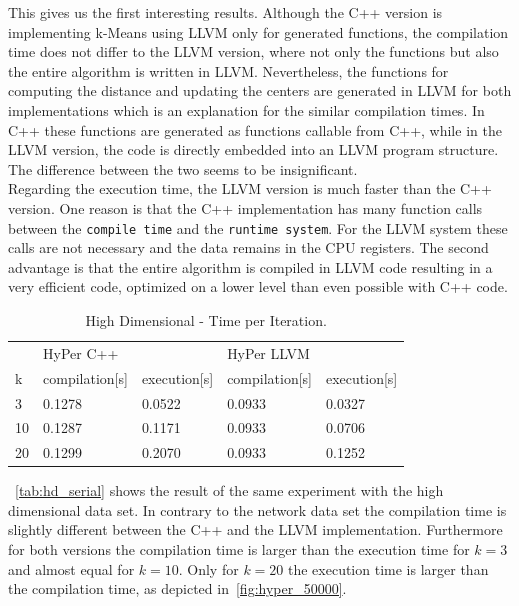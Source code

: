 This gives us the first interesting results. Although the C++ version is implementing k-Means using LLVM only for generated functions, the compilation time does not differ to the LLVM version, where not only the functions but also the entire algorithm is written in LLVM. Nevertheless, the functions for computing the distance and updating the centers are generated in LLVM for both implementations which is an explanation for the similar compilation times. In C++ these functions are generated as functions callable from C++, while in the LLVM version, the code is directly embedded into an LLVM program structure. The difference between the two seems to be insignificant.
\\
Regarding the execution time, the LLVM version is much faster than the C++ version. One reason is that the C++ implementation has many function calls between the \texttt{compile time} and the \texttt{runtime system}. For the LLVM system these calls are not necessary and the data remains in the CPU registers. The second advantage is that the entire algorithm is compiled in LLVM code resulting in a very efficient code, optimized on a lower level than even possible with C++ code.


\begin{table}[htsb]
  \caption[High Dimensional - Time per Iteration]{High Dimensional - Time per Iteration.}\label{tab:hd_serial}
  \centering
  \begin{tabular}{l l l l l}
    \toprule
      & HyPer C++ & & HyPer LLVM & \\
      k & compilation[s] & execution[s] & compilation[s] & execution[s] \\
    \midrule
      3  & 0.1278 & 0.0522 & 0.0933 & 0.0327 \\
      10 & 0.1287 & 0.1171 & 0.0933 & 0.0706 \\
      20 & 0.1299 & 0.2070 & 0.0933 & 0.1252 \\
    \bottomrule
  \end{tabular}
\end{table}

~\autoref{tab:hd_serial} shows the result of the same experiment with the high dimensional data set. In contrary to the network data set the compilation time is slightly different between the C++ and the LLVM implementation. Furthermore for both versions the compilation time is larger than the execution time for $k = 3$ and almost equal for $k = 10$. Only for $k = 20$ the execution time is larger than the compilation time, as depicted in~\autoref{fig:hyper_50000}.

